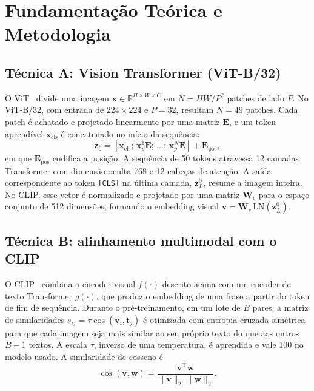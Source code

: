 \documentclass[conference]{IEEEtran}
\begin{document}
\section{Fundamentação Teórica e Metodologia}

\subsection{Técnica A: Vision Transformer (ViT-B/32)}

O ViT~\cite{dosovitskiy2020} divide uma imagem $\mathbf{x} \in \mathbb{R}^{H \times W \times C}$ em $N = HW/P^2$ patches de lado $P$. No ViT-B/32, com entrada de $224 \times 224$ e $P = 32$, resultam $N = 49$ patches. Cada patch é achatado e projetado linearmente por uma matriz $\mathbf{E}$, e um token aprendível $\mathbf{x}_{\text{cls}}$ é concatenado no início da sequência:
\begin{equation}
\mathbf{z}_0 = [\mathbf{x}_{\text{cls}};\, \mathbf{x}_p^1\mathbf{E};\, \dots;\, \mathbf{x}_p^N\mathbf{E}] + \mathbf{E}_{\text{pos}},
\end{equation}
em que $\mathbf{E}_{\text{pos}}$ codifica a posição. A sequência de 50 tokens atravessa 12 camadas Transformer com dimensão oculta 768 e 12 cabeças de atenção. A saída correspondente ao token \texttt{[CLS]} na última camada, $\mathbf{z}_L^0$, resume a imagem inteira. No CLIP, esse vetor é normalizado e projetado por uma matriz $\mathbf{W}_v$ para o espaço conjunto de 512 dimensões, formando o embedding visual $\mathbf{v} = \mathbf{W}_v\,\mathrm{LN}(\mathbf{z}_L^0)$.

\subsection{Técnica B: alinhamento multimodal com o CLIP}

O CLIP~\cite{radford2021} combina o encoder visual $f(\cdot)$ descrito acima com um encoder de texto Transformer $g(\cdot)$, que produz o embedding de uma frase a partir do token de fim de sequência. Durante o pré-treinamento, em um lote de $B$ pares, a matriz de similaridades $s_{ij} = \tau \cos(\mathbf{v}_i, \mathbf{t}_j)$ é otimizada com entropia cruzada simétrica para que cada imagem seja mais similar ao seu próprio texto do que aos outros $B-1$ textos. A escala $\tau$, inverso de uma temperatura, é aprendida e vale 100 no modelo usado. A similaridade de cosseno é
\begin{equation}
\cos(\mathbf{v}, \mathbf{w}) = \frac{\mathbf{v}^\top \mathbf{w}}{\lVert \mathbf{v} \rVert_2\, \lVert \mathbf{w} \rVert_2}.
\end{equation}
\end{document}
